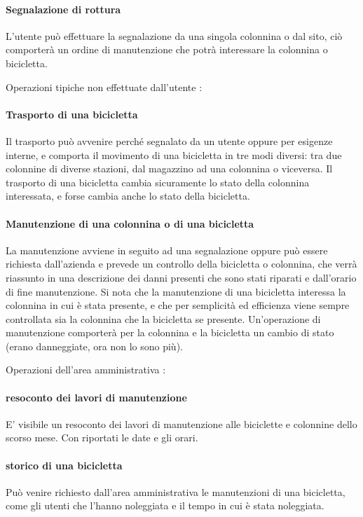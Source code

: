 \documentclass[a4paper,twoside]{article}
\begin{document}
\paragraph{Segnalazione di rottura} L'utente può effettuare la segnalazione da una singola colonnina o dal sito, ciò comporterà un ordine di manutenzione che potrà interessare la colonnina o bicicletta.
\par Operazioni tipiche non effettuate dall'utente :
\paragraph{Trasporto di una bicicletta} Il trasporto può avvenire perché segnalato da un utente oppure per esigenze interne, e comporta il movimento di una bicicletta in tre modi diversi: tra due colonnine di diverse stazioni, dal magazzino ad una colonnina o viceversa. Il trasporto di una bicicletta cambia sicuramente lo stato della colonnina interessata, e forse cambia anche lo stato della bicicletta.
\paragraph{Manutenzione di una colonnina o di una bicicletta} La manutenzione avviene in seguito ad una segnalazione oppure può essere richiesta dall'azienda e prevede un controllo della bicicletta o colonnina, che verrà riassunto in una descrizione dei danni presenti che sono stati riparati e dall'orario di fine manutenzione. Si nota che la manutenzione di una bicicletta interessa la colonnina in cui è stata presente, e che per semplicità ed efficienza viene sempre controllata sia la colonnina che la bicicletta se presente. Un'operazione di manutenzione comporterà per la colonnina e la bicicletta un cambio di stato (erano danneggiate, ora non lo sono più).
\par Operazioni dell'area amministrativa :
\paragraph{resoconto dei lavori di manutenzione} E' visibile un resoconto dei lavori di manutenzione alle biciclette e colonnine dello scorso mese. Con riportati le date e gli orari.
\paragraph{storico di una bicicletta} Può venire richiesto dall'area amministrativa le manutenzioni di una bicicletta, come gli utenti che l'hanno noleggiata e il tempo in cui è stata noleggiata.
\end{document}
